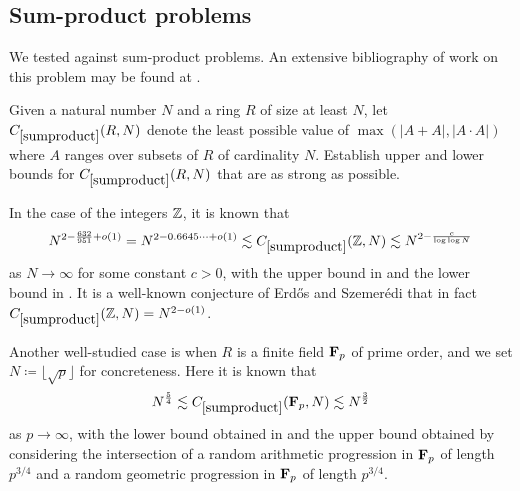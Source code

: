 \subsection{Sum-product problems}

We tested \AlphaEvolve against sum-product problems.  An extensive bibliography of work on this problem may be found at \cite{bloom2024sumproduct}.

\renewcommand{\problemURL}{https://google-deepmind.github.io/alphaevolve_repository_of_problems/problems/45.html}

\begin{problem}\label{sumproduct}  Given a natural number $N$ and a ring $R$ of size at least $N$, let $C_{\ref{sumproduct}}(R, N)$ denote the least possible value of $\max(|A+A|, |A \cdot A|)$ where $A$ ranges over subsets of $R$ of cardinality $N$.  Establish upper and lower bounds for $C_{\ref{sumproduct}}(R, N)$ that are as strong as possible.
\end{problem}

In the case of the integers $\mathbb{Z}$, it is known that
\begin{equation}\label{upper}
 N^{2 - \frac{632}{951}+o(1)} = N^{2-0.6645\dots+o(1)} \lesssim C_{\ref{sumproduct}}(\mathbb{Z},N) \lesssim N^{2-\frac{c}{\log\log N}}
\end{equation}
as $N \to \infty$ for some constant $c>0$, with the upper bound in \cite{sum-product} and the lower bound in \cite{bloom}.  It is a well-known conjecture of Erd\H{o}s and Szemer\'edi \cite{sum-product} that
in fact $C_{\ref{sumproduct}}(\mathbb{Z},N) = N^{2-o(1)}$.

Another well-studied case is when $R$ is a finite field $\mathbf{F}_p$ of prime order, and we set $N \coloneqq \lfloor \sqrt{p}\rfloor$ for concreteness.  Here it is known that
$$ N^{\frac{5}{4}} \lesssim C_{\ref{sumproduct}}(\mathbf{F}_p,N) \lesssim N^{\frac{3}{2}}$$ 
as $p \to \infty$, with the lower bound obtained in \cite{mohammadi} and the upper bound obtained by considering the intersection of a random arithmetic progression in $\mathbf{F}_p$ of length $p^{3/4}$ and a random geometric progression in $\mathbf{F}_p$ of length $p^{3/4}$.

